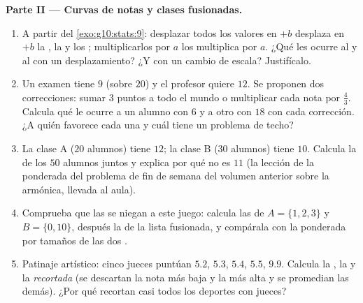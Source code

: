 \begin{problem}
\medskip
\noindent\textbf{Parte II --- Curvas de notas y clases fusionadas.}
\begin{enumerate}[resume]
  \item A partir del \cref{exo:g10:stats:9}: desplazar todos los valores
        en $+b$ desplaza en $+b$ la , la  y los ;
        multiplicarlos por $a$ los multiplica por $a$. ¿Qué les ocurre al
         y al  con un desplazamiento?
        ¿Y con un cambio de escala? Justifícalo.
  \item Un examen tiene  $9$ (sobre $20$) y el profesor quiere 
        $12$. Se proponen dos correcciones: sumar $3$ puntos a todo el
        mundo o multiplicar cada nota por $\frac43$. Calcula qué le ocurre
        a un alumno con $6$ y a otro con $18$ con cada corrección. ¿A
        quién favorece cada una y cuál tiene un problema de techo?
  \item La clase A ($20$ alumnos) tiene  $12$; la clase B ($30$
        alumnos) tiene  $10$. Calcula la  de los $50$ alumnos
        juntos y explica por qué no es $11$ (la lección de la 
        ponderada del problema de fin de semana del volumen anterior sobre
        la  armónica, llevada al aula).
  \item Comprueba que las  se niegan a este juego: calcula las
         de $A = \{1, 2, 3\}$ y $B = \{0, 10\}$, después la
         de la lista fusionada, y compárala con la  ponderada
        por tamaños de las dos .
  \item Patinaje artístico: cinco jueces puntúan $5.2$, $5.3$, $5.4$,
        $5.5$, $9.9$. Calcula la , la  y la \emph{
        recortada} (se descartan la nota más baja y la más alta y se
        promedian las demás). ¿Por qué recortan casi todos los deportes
        con jueces?
\end{enumerate}


\end{problem}
